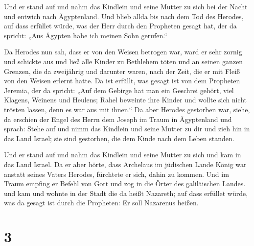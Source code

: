  Und er stand auf und nahm das Kindlein und seine Mutter
zu sich bei der Nacht und entwich nach Ägyptenland.  Und
blieb allda bis nach dem Tod des Herodes, auf dass erfüllet würde, was
der Herr durch den Propheten gesagt hat, der da spricht: „Aus Ägypten
habe ich meinen Sohn gerufen.``

 Da Herodes nun sah, dass er von den Weisen betrogen war,
ward er sehr zornig und schickte aus und ließ alle Kinder zu Bethlehem
töten und an seinen ganzen Grenzen, die da zweijährig und darunter
waren, nach der Zeit, die er mit Fleiß von den Weisen erlernt hatte.
 Da ist erfüllt, was gesagt ist von dem Propheten
Jeremia, der da spricht:  „Auf dem Gebirge hat man ein
Geschrei gehört, viel Klagens, Weinens und Heulens; Rahel beweinte ihre
Kinder und wollte sich nicht trösten lassen, denn es war aus mit
ihnen.``  Da aber Herodes gestorben war, siehe, da
erschien der Engel des Herrn dem Joseph im Traum in Ägyptenland
 und sprach: Stehe auf und nimm das Kindlein und seine
Mutter zu dir und zieh hin in das Land Israel; sie sind gestorben, die
dem Kinde nach dem Leben standen.

 Und er stand auf und nahm das Kindlein und seine Mutter
zu sich und kam in das Land Israel.  Da er aber hörte,
dass Archelaus im jüdischen Lande König war anstatt seines Vaters
Herodes, fürchtete er sich, dahin zu kommen. Und im Traum empfing er
Befehl von Gott und zog in die Örter des galiläischen Landes.
 und kam und wohnte in der Stadt die da heißt Nazareth;
auf dass erfüllet würde, was da gesagt ist durch die Propheten: Er soll
Nazarenus heißen.

\hypertarget{section-2}{%
\section{3}\label{section-2}}

